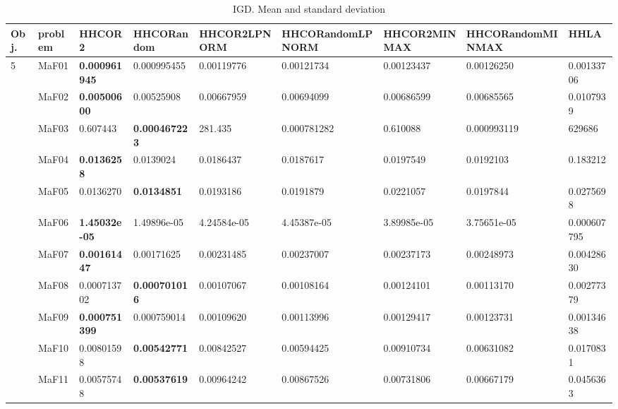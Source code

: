 \documentclass[]{article}
\begin{document}
\begin{landscape}
\begin{table}
\caption{IGD. Mean and standard deviation}
\label{table:mean.IGD}
\centering
\begin{footnotesize}
\begin{tabular}{|l|l|l|l|l|l|l|l|l|}
\hline
Obj. & problem  & HHCOR2 & HHCORandom & HHCOR2LPNORM & HHCORandomLPNORM & HHCOR2MINMAX & HHCORandomMINMAX & HHLA \\ \hline

\multirow{15}{*}{5} & MaF01 & \cellcolor{gray95} {\bf 0.000961945} & \cellcolor{gray95} 0.000995455 & 0.00119776 & 0.00121734 & 0.00123437 & 0.00126250 & 0.00133706\\
 & MaF02 & \cellcolor{gray95} {\bf 0.00500600} & \cellcolor{gray95} 0.00525908 & 0.00667959 & 0.00694099 & 0.00686599 & 0.00685565 & 0.0107939\\
 & MaF03 & 0.607443 & \cellcolor{gray95} {\bf 0.000467223} & 281.435 & \cellcolor{gray95} 0.000781282 & 0.610088 & 0.000993119 & 629686\\
 & MaF04 & \cellcolor{gray95} {\bf 0.0136258} & \cellcolor{gray95} 0.0139024 & 0.0186437 & 0.0187617 & 0.0197549 & 0.0192103 & 0.183212\\
 & MaF05 & \cellcolor{gray95} 0.0136270 & \cellcolor{gray95} {\bf 0.0134851} & 0.0193186 & 0.0191879 & 0.0221057 & 0.0197844 & 0.0275698\\
 & MaF06 & \cellcolor{gray95} {\bf 1.45032e-05} & \cellcolor{gray95} 1.49896e-05 & 4.24584e-05 & 4.45387e-05 & 3.89985e-05 & 3.75651e-05 & 0.000607795\\
 & MaF07 & \cellcolor{gray95} {\bf 0.00161447} & \cellcolor{gray95} 0.00171625 & 0.00231485 & 0.00237007 & 0.00237173 & 0.00248973 & 0.00428630\\
 & MaF08 & \cellcolor{gray95} 0.000713702 & \cellcolor{gray95} {\bf 0.000701016} & 0.00107067 & 0.00108164 & 0.00124101 & 0.00113170 & 0.00277379\\
 & MaF09 & \cellcolor{gray95} {\bf 0.000751399} & \cellcolor{gray95} 0.000759014 & 0.00109620 & 0.00113996 & 0.00129417 & 0.00123731 & 0.00134638\\
 & MaF10 & 0.00801598 & \cellcolor{gray95} {\bf 0.00542771} & 0.00842527 & \cellcolor{gray95} 0.00594425 & 0.00910734 & \cellcolor{gray95} 0.00631082 & 0.0170831\\
 & MaF11 & \cellcolor{gray95} 0.00575748 & \cellcolor{gray95} {\bf 0.00537619} & 0.00964242 & 0.00867526 & 0.00731806 & \cellcolor{gray95} 0.00667179 & 0.0456363\\

\end{tabular}
\end{footnotesize}
\end{table}
\end{landscape}
\end{document}
